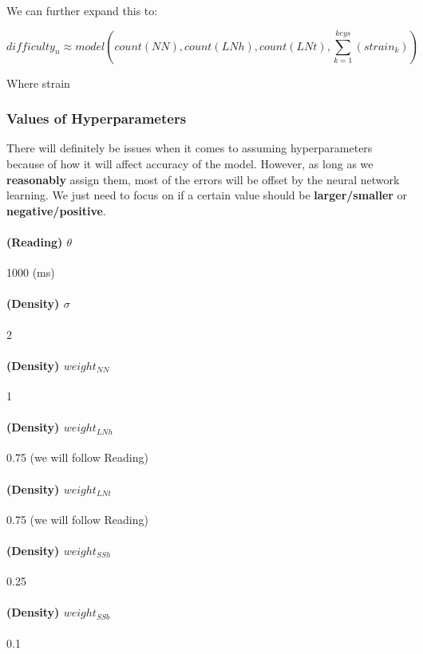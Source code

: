 We can further expand this to:

$$ difficulty_n \approx model \left( count(NN), count(LNh), count(LNt), \sum_{k=1}^{keys} \left(strain_k \right)  \right)  $$

Where strain

\subsubsection{Values of Hyperparameters}

There will definitely be issues when it comes to assuming hyperparameters because of how it will affect accuracy of the model. However, as long as we \textbf{reasonably} assign them, most of the errors will be offset by the neural network learning. We just need to focus on if a certain value should be \textbf{larger/smaller} or \textbf{negative/positive}.

\paragraph{(Reading) $\theta$} 1000 (ms)

\paragraph{(Density) $\sigma$} 2

\paragraph{(Density) $weight_{NN}$} 1
\paragraph{(Density) $weight_{LNh}$} 0.75 (we will follow Reading)
\paragraph{(Density) $weight_{LNt}$} 0.75 (we will follow Reading)
\paragraph{(Density) $weight_{SSh}$} 0.25
\paragraph{(Density) $weight_{SSb}$} 0.1


